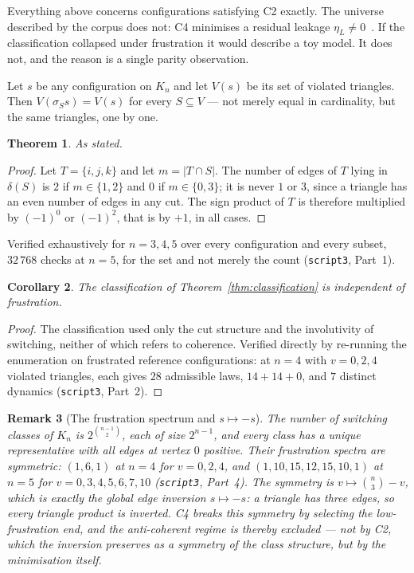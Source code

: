 \documentclass[11pt,a4paper]{article}
\def\mathcal#1{#1}%
\newtheorem{theorem}{Theorem}[section]
\newtheorem{corollary}[theorem]{Corollary}
\newtheorem{remark}[theorem]{Remark}
\newcommand{\Kn}{K_n}
\newcommand{\etaL}{\eta_L}
\begin{document}
Everything above concerns configurations satisfying C2 exactly. The universe described by the corpus does not: C4 minimises a residual leakage $\etaL\neq0$~\citep{D08}. If the classification collapsed under frustration it would describe a toy model. It does not, and the reason is a single parity observation.

\begin{theorembox}
Let $s$ be any configuration on $\Kn$ and let $\mathcal{V}(s)$ be its set of violated triangles. Then $\mathcal{V}(\sigma_S s)=\mathcal{V}(s)$ for every $S\subseteq V$ --- not merely equal in cardinality, but the same triangles, one by one.
\end{theorembox}

\begin{theorem}
\label{thm:invariance}
As stated.
\end{theorem}

\begin{proof}
Let $T=\{i,j,k\}$ and let $m=|T\cap S|$. The number of edges of $T$ lying in $\delta(S)$ is $2$ if $m\in\{1,2\}$ and $0$ if $m\in\{0,3\}$; it is never $1$ or $3$, since a triangle has an even number of edges in any cut. The sign product of $T$ is therefore multiplied by $(-1)^0$ or $(-1)^2$, that is by $+1$, in all cases.
\end{proof}

Verified exhaustively for $n=3,4,5$ over every configuration and every subset, $32\,768$ checks at $n=5$, for the set and not merely the count (\texttt{script3}, Part~1).

\begin{corollary}
\label{cor:notoy}
The classification of Theorem~\ref{thm:classification} is independent of frustration.
\end{corollary}

\begin{proof}
The classification used only the cut structure and the involutivity of switching, neither of which refers to coherence. Verified directly by re-running the enumeration on frustrated reference configurations: at $n=4$ with $v=0,2,4$ violated triangles, each gives $28$ admissible laws, $14+14+0$, and $7$ distinct dynamics (\texttt{script3}, Part~2).
\end{proof}

\begin{remark}[The frustration spectrum and $s\mapsto-s$]
\label{rem:spectrum}
The number of switching classes of $\Kn$ is $2^{\binom{n-1}{2}}$, each of size $2^{n-1}$, and every class has a unique representative with all edges at vertex $0$ positive. Their frustration spectra are symmetric: $(1,6,1)$ at $n=4$ for $v=0,2,4$, and $(1,10,15,12,15,10,1)$ at $n=5$ for $v=0,3,4,5,6,7,10$ (\texttt{script3}, Part~4). The symmetry is $v\mapsto\binom{n}{3}-v$, which is exactly the global edge inversion $s\mapsto-s$: a triangle has three edges, so every triangle product is inverted. C4 breaks this symmetry by selecting the low-frustration end, and the anti-coherent regime is thereby excluded --- not by C2, which the inversion preserves as a symmetry of the class structure, but by the minimisation itself.
\end{remark}
\end{document}
